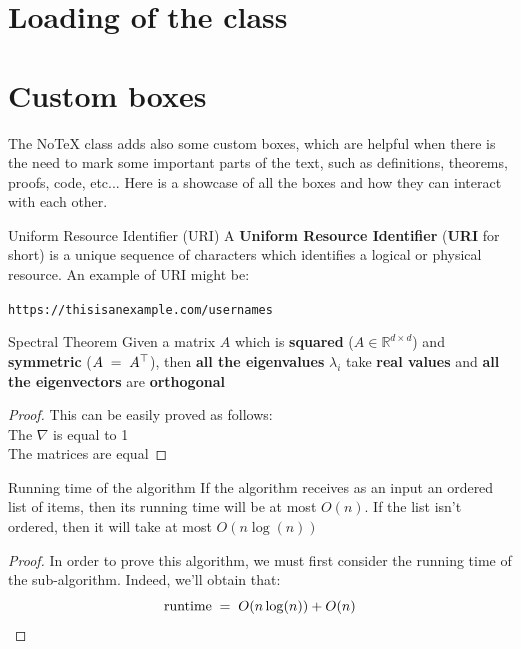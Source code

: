 \documentclass[]{notex}
\begin{document}
\section{Loading of the class}

\section{Custom boxes}

The NoTeX class adds also some custom boxes, which are helpful when there is the need to mark some important parts of the text, such as definitions, theorems, proofs, code, etc... Here is a showcase of all the boxes and how they can interact with each other.

\begin{definition}{Uniform Resource Identifier (URI)}
    A \textbf{Uniform Resource Identifier} (\textbf{URI} for short) is a unique sequence of characters which identifies a logical or physical resource. An example of URI might be:
    
    \medskip

    \texttt{https://thisisanexample.com/usernames}
\end{definition}

\begin{theorem}{Spectral Theorem}
    Given a matrix $A$ which is \textbf{squared} ($A \in \mathbb{R}^{d \times d}$) and \textbf{symmetric} ($A \; = \; A^\top$), then \textbf{all the eigenvalues} $\lambda_i$ take \textbf{real values} and \textbf{all the eigenvectors} are \textbf{orthogonal}
    
    \begin{proof}
        This can be easily proved as follows:\\
        \noindent The $\nabla$ is equal to 1\\
        \noindent The matrices are equal
    \end{proof}
\end{theorem}

\begin{lemma}{Running time of the algorithm}
    If the algorithm receives as an input an ordered list of items, then its running time will be at most $O(n)$. If the list isn't ordered, then it will take at most $O(n \log(n))$

    \begin{proof}
        In order to prove this algorithm, we must first consider the running time of the sub-algorithm. Indeed, we'll obtain that:
        \[ \text{runtime} \; = \; O(n \log(n)) + O(n) \]
    \end{proof}
\end{lemma}
\end{document}
